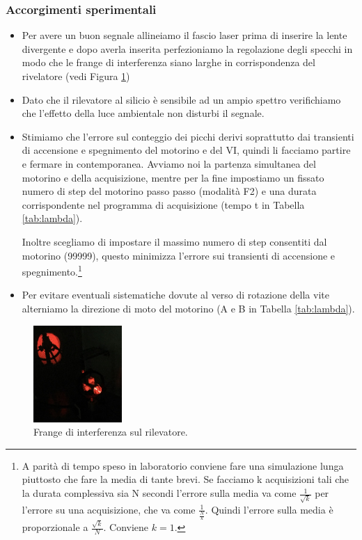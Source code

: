 \documentclass[a4paper]{article}
\begin{document}
\subsubsection{Accorgimenti sperimentali}
\begin{itemize}
	\item Per avere un buon segnale allineiamo il fascio laser prima di inserire la lente divergente e dopo averla inserita perfezioniamo la regolazione degli specchi in modo che le frange di interferenza siano larghe in corrispondenza del rivelatore (vedi Figura \ref{fig:frange})
	\item Dato che il rilevatore al silicio è sensibile ad un ampio spettro verifichiamo che l'effetto della luce ambientale non disturbi il segnale.
	\item Stimiamo che l'errore sul conteggio dei picchi derivi soprattutto dai transienti di accensione e spegnimento del motorino e del VI, quindi li facciamo partire e fermare in contemporanea. Avviamo noi la partenza simultanea del motorino e della acquisizione, mentre per la fine impostiamo un fissato numero di step del motorino passo passo (modalità F2) e una durata corrispondente nel programma di acquisizione (tempo t in Tabella \ref{tab:lambda}).
	
	Inoltre scegliamo di impostare il massimo numero di step consentiti dal motorino (99999), questo minimizza l'errore sui transienti di accensione e spegnimento.\footnote{A parità di tempo speso in laboratorio conviene fare una simulazione lunga piuttosto che fare la media di tante brevi. Se facciamo k acquisizioni tali che la durata complessiva sia N secondi l'errore sulla media va come $\frac{1}{\sqrt{k}}$ per l'errore su una acquisizione, che va come $\frac{1}{\frac{N}{k}}$. Quindi l'errore sulla media è proporzionale a $\frac{\sqrt{k}}{N}$. Conviene $k=1$.}
	\item Per evitare eventuali sistematiche dovute al verso di rotazione della vite alterniamo la direzione di moto del motorino (A e B in Tabella \ref{tab:lambda}).
\end{itemize}

\begin{figure}[H]
	\includegraphics[width=0.3\textwidth]{frange.jpg}
	\caption{Frange di interferenza sul rilevatore.}
	\label{fig:frange}
\end{figure}
\end{document}
